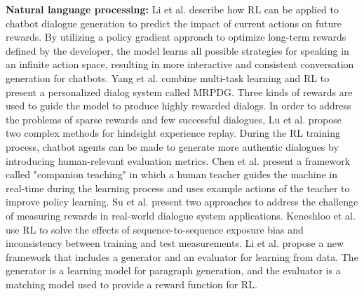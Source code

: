 \documentclass[acmsmall]{acmart}
\begin{document}
\textbf{Natural language processing: }
Li et al. \cite{li2016deep} describe how RL can be applied to chatbot dialogue generation to predict the impact of current actions on future rewards. By utilizing a policy gradient approach to optimize long-term rewards defined by the developer, the model learns all possible strategies for speaking in an infinite action space, resulting in more interactive and consistent conversation generation for chatbots. %
Yang et al. \cite{9025776} combine multi-task learning and RL to present a personalized dialog system called MRPDG. Three kinds of rewards are used to guide the model to produce highly rewarded dialogs.
In order to address the problems of sparse rewards and few successful dialogues, Lu et al. \cite{Lu_Zhang_Chen_2019} propose two complex methods for hindsight experience replay. 
During the RL training process, chatbot agents can be made to generate more authentic dialogues by introducing human-relevant evaluation metrics. Chen et al. \cite{chen-etal-2017-line} present a framework called "companion teaching" in which a human teacher guides the machine in real-time during the learning process and uses example actions of the teacher to improve policy learning. Su et al. \cite{SU201824} present two approaches to address the challenge of measuring rewards in real-world dialogue system applications.
Keneshloo et al. \cite{8801910} use RL to solve the effects of sequence-to-sequence exposure bias and inconsistency between training and test measurements.
Li et al. \cite{li2017paraphrase} propose a new framework that includes a generator and an evaluator for learning from data. The generator is a learning model for paragraph generation, and the evaluator is a matching model used to provide a reward function for RL.
\end{document}

